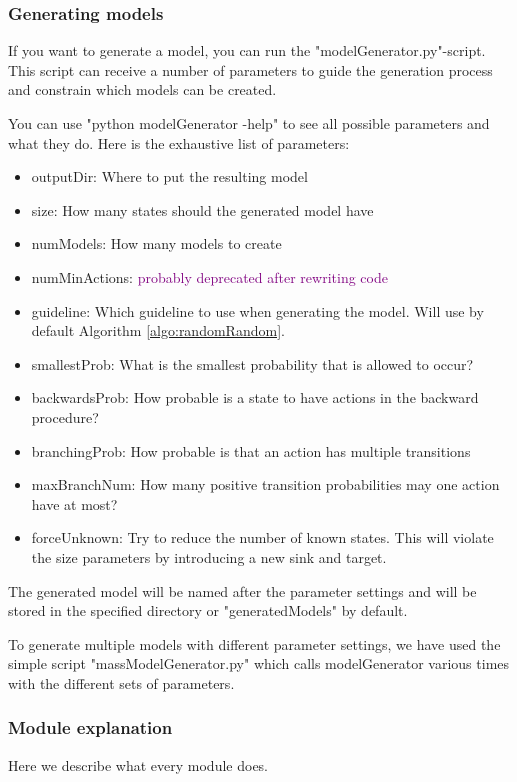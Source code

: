 \subsubsection*{Generating models}
If you want to generate a model, you can run the "modelGenerator.py"-script.
This script can receive a number of parameters to guide the generation process and constrain which models can be created.

You can use "python modelGenerator -help" to see all possible parameters and what they do.
Here is the exhaustive list of parameters:
\begin{itemize} \label{list:params}
    \item outputDir: Where to put the resulting model
    \item size: How many states should the generated model have
    \item numModels: How many models to create
    \item numMinActions: \textcolor{purple}{probably deprecated after rewriting code}
    \item guideline: Which guideline to use when generating the model. Will use by default Algorithm \ref{algo:randomRandom}.
    \item smallestProb: What is the smallest probability that is allowed to occur?
    \item backwardsProb: How probable is a state to have actions in the backward procedure?
    \item branchingProb: How probable is that an action has multiple transitions
    \item maxBranchNum: How many positive transition probabilities may one action have at most?
    \item forceUnknown: Try to reduce the number of known states. This will violate the size parameters by introducing a new sink and target.
\end{itemize}

The generated model will be named after the parameter settings and will be stored in the specified directory or "generatedModels" by default.

To generate multiple models with different parameter settings, we have used the simple script "massModelGenerator.py" which calls modelGenerator various times with the different sets of parameters.

\subsubsection*{Module explanation}
Here we describe what every module does.

